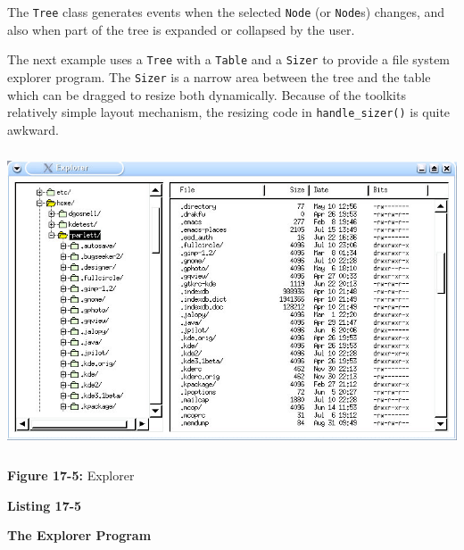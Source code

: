 The \texttt{Tree} class generates events when the selected \texttt{Node}
(or \texttt{Node}s) changes, and also when part of the tree is expanded
or collapsed by the user.

The next example uses a \texttt{Tree} with a \texttt{Table} and a
\texttt{Sizer} to provide a file system explorer program.
The \texttt{Sizer} is a narrow area between
the tree and the table which can be dragged to resize both dynamically.
Because of the toolkit{\textquotesingle}s relatively simple layout
mechanism, the resizing code in \texttt{handle\_sizer()} is quite
awkward.



\begin{center}
\includegraphics[width=5.8134in,height=3.4898in]{ub-img/ub-img54.jpg}
\end{center}

{\sffamily\bfseries Figure 17-5:}
{\sffamily Explorer}


\bigskip

{\sffamily\bfseries
Listing 17-5}

{\sffamily\bfseries
The Explorer Program}

